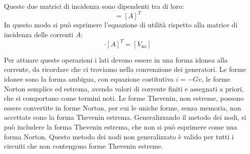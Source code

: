 \documentclass{article}
\numberwithin{equation}{subsection}
\begin{document}
Queste due matrici di incidenza sono dipendenti tra di loro:
\begin{equation*}
    [B]=[A]^T
\end{equation*}
In questo modo si può esprimere l'equazione di utilità rispetto alla matrice di incidenza delle correnti $A$:
\begin{equation*}
    [v_l]\cdot[A]^T=[V_\mathrm{no}]
\end{equation*}

Per attuare queste operazioni i lati devono essere in una forma idonea alla corrente, da ricordare che ci troviamo nella convenzione dei generatori. 
Le forme idonee sono la forma ambigua, con equazione costitutiva $i=-Gv$, le forme Norton semplice ed estrema, avendo valori di corrente finiti e assegnati a priori, che si 
comportano come termini noti. Le forme Thevenin, non estreme, possono essere convertite in forme Norton, per cui le uniche forme, senza memoria, non accettate sono 
la forma Thevenin estrema. Generalizzando il metodo dei nodi, si può includere la forma Thevenin estrema, che non si può esprimere come una forma Norton. 
Questo metodo dei nodi non generalizzato è valido per tutti i circuiti che non contengono forme Thevenin estreme. 
\end{document}

